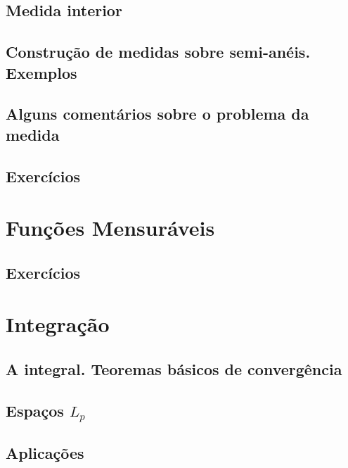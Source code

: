 \documentclass[
]{book}
\begin{document}
\section{Medida interior}\label{medida-interior}

\section{Construção de medidas sobre semi-anéis. Exemplos}\label{construuxe7uxe3o-de-medidas-sobre-semi-anuxe9is.-exemplos}

\section{Alguns comentários sobre o problema da medida}\label{alguns-comentuxe1rios-sobre-o-problema-da-medida}

\section*{Exercícios}\label{exercuxedcios-2}

\chapter{Funções Mensuráveis}\label{funuxe7uxf5es-mensuruxe1veis}

\section*{Exercícios}\label{exercuxedcios-3}

\chapter{Integração}\label{integrauxe7uxe3o}

\section{A integral. Teoremas básicos de convergência}\label{a-integral.-teoremas-buxe1sicos-de-converguxeancia}

\section{\texorpdfstring{Espaços \(L_p\)}{Espaços L\_p}}\label{espauxe7os-l_p}

\section{Aplicações}\label{aplicauxe7uxf5es}
\end{document}
